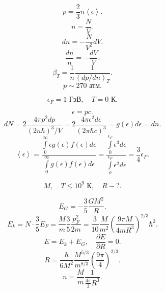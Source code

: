 \documentclass[a4paper]{article}
\begin{document}
\begin{sol}
\[
p= \frac{2}{3} n \left<\epsilon \right>
.\] 
\[
n=\frac{N}{V}
.\] 
\[
dn=- \frac{N}{V^2}dV
.\] 
\[
\frac{dn}{n}=-\frac{dV}{V}
.\] 
\[
	\beta_T=\frac{1}{n} \frac{1}{\left( dp /dn \right) _T}
.\] 
\[
p\sim  270\text{ атм}
.\] 
\end{sol}
\begin{hiProb}[Задача 3.27]
\[
\epsilon_F=1\text{ ГэВ},\quad T=0\text{ К}
.\] 
\end{hiProb}
\begin{sol}
\[
\epsilon=pc
.\] 
\[
	dN=2 \frac{4\pi p^2 dp}{(2n \hbar)^3 /V}=
	2 \frac{4\pi \epsilon^2 d\epsilon }{(2\pi \hbar c)^3}=g(\epsilon) d\epsilon=dn
.\] 
\[
\left<\epsilon  \right>= \frac{\int\limits_{0}^{\infty} \epsilon
g(\epsilon) f(\epsilon) d\epsilon }{\int\limits_{0}^{\infty} 
g(\epsilon) f(\epsilon) d\epsilon }=
\frac{\int\limits_{0}^{\epsilon_F} \epsilon^3 d \epsilon  }{\int\limits_{o}^{\epsilon_F} \epsilon^2 d\epsilon }= \frac{3}{4}\epsilon_F
.\] 
\end{sol}
\begin{hiProb}[Задача Т3.1]
\[
	M,\quad T\le 10^9 \text{ К},\quad R-?
.\] 
\end{hiProb}
\begin{sol}
\[
E_G=-\frac{3}{5} \frac{G M^2}{R}
.\] 
\[
E_k=N \cdot \frac{3}{5}E_F= \frac{M}{m}\frac{3}{5} 
\frac{p_F^2}{2m}=\frac{3}{10} \frac{M}{m^2} \left( 
\frac{9\pi M}{4m R^3}\right) ^{2 /3}\hbar^2
.\] 
\[
E=E_k+E_G,\quad \frac{\partial E}{\partial R} =0
.\] 
\[
	R= \frac{\hbar }{6 M^2} \frac{M^{5 /3}}{m^{8 /3}} \left( 
	\frac{9\pi}{4}\right) ^{2 /3}
.\] 
\[
n= \frac{M}{m} \frac{1}{\frac{4\pi}{3} R^3}
.\] 
\end{sol}
\end{document}
